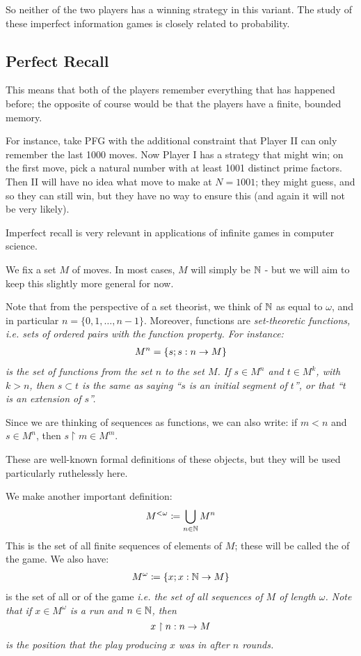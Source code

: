 \documentclass[]{article}
\begin{document}
So neither of the two players has a winning strategy in this variant. The study of these imperfect information games is closely related to probability.

\subsection{Perfect Recall}

This means that both of the players remember everything that has happened before; the opposite of course would be that the players have a finite, bounded memory.

For instance, take PFG with the additional constraint that Player II can only remember the last 1000 moves. Now Player I has a strategy that might win; on the first move, pick a natural number with at least 1001 distinct prime factors. Then II will have no idea what move to make at $N = 1001$; they might guess, and so they can still win, but they have no way to ensure this (and again it will not be very likely).

Imperfect recall is very relevant in applications of infinite games in computer science.


We fix a set $M$ of moves. In most cases, $M$ will simply be $\mathbb{N}$ - but we will aim to keep this slightly more general for now.

Note that from the perspective of a set theorist, we think of $\mathbb{N}$ as equal to $\omega$, and in particular $n = \{0,1,\dots,n-1\}$. Moreover, functions are \it{set-theoretic} functions, \it{i.e.} sets of ordered pairs with the function property. For instance:
\begin{align*}
    M^n = \{s; s:n\rightarrow M\}
\end{align*}
is the set of functions from the \it{set} $n$ to the set $M$. If $s\in M^n$ and $t \in M^k$, with $k>n$, then $s\subset t$ is the same as saying ``$s$ is an initial segment of $t$'', or that ``$t$ is an extension of $s$''.

Since we are thinking of sequences as functions, we can also write: if $m<n$ and $s \in M^n$, then $s\restriction m \in M^m$.

These are well-known formal definitions of these objects, but they will be used particularly ruthelessly here.

We make another important definition:
\begin{align*}
    M^{<\omega} \coloneqq \bigcup_{n\in \mathbb{N}}M^n
\end{align*}
This is the set of all finite sequences of elements of $M$; these will be called the  of the game. We also have:
\begin{align*}
    M^\omega \coloneqq \{x;x:\mathbb{N}\rightarrow M\}
\end{align*}
is the set of all  or  of the game \it{i.e.} the set of all sequences of $M$ of length $\omega$. Note that if $x\in M^\omega$ is a run and $n\in \mathbb{N}$, then $$x\restriction n:n\rightarrow M$$ is the position that the play producing $x$ was in after $n$ rounds.
\end{document}
